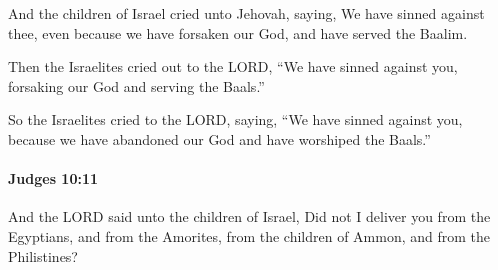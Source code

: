 			\begin{versebox}
					\item[BHS] 
					\item[ASV] And the children of Israel cried unto Jehovah, saying, We have sinned against thee, even because we have forsaken our God, and have served the Baalim.
					\item[NIV] Then the Israelites cried out to the LORD, “We have sinned against you, forsaking our God and serving the Baals.”
					\item[NRSV] So the Israelites cried to the LORD, saying, “We have sinned against you, because we have abandoned our God and have worshiped the Baals.”
			\end{versebox}

		\paragraph{Judges 10:11} %
			\label{JUDGES-10-11}

			And the LORD said unto the children of Israel, Did not I deliver you from the Egyptians, and from the Amorites, from the children of Ammon, and from the Philistines?

